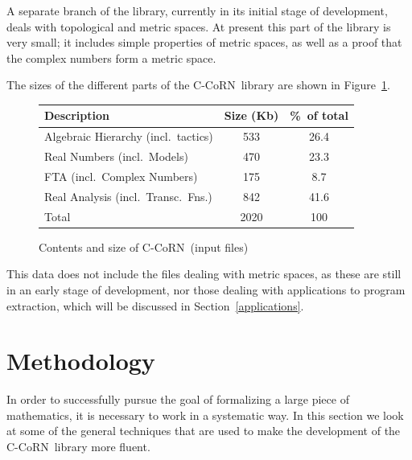 \documentclass[runningheads]{llncs}
\newcommand{\ccorn}{\mbox{C-CoRN}}
\begin{document}
A separate branch of the library, currently in its initial stage of
development, deals with topological and metric spaces.
At present this part of the library is very small; it includes simple
properties of metric spaces, as well as a proof that the complex numbers
form a metric space.

The sizes of the different parts of the \ccorn\ library are shown in
Figure~\ref{fig:contents}.
\begin{figure}
\hfill\begin{tabular}{l|c|c}
 Description                          & Size (Kb) & \%\ of total \\ \hline
 Algebraic Hierarchy (incl.\ tactics) & 533       & 26.4         \\
 Real Numbers (incl.\ Models)         & 470       & 23.3         \\
 FTA (incl.\ Complex Numbers)         & 175       &  8.7         \\
 Real Analysis (incl.\ Transc.\ Fns.) & 842       & 41.6         \\ \hline
 Total                                & 2020      & 100          \\ \hline
\end{tabular}\hspace*{\fill}
\caption{Contents and size of \ccorn\ (input files)}
\label{fig:contents}
\end{figure}
This data does not include the files dealing with metric spaces, as these are
still in an early stage of development, nor those dealing with applications to
program extraction, which will be discussed in Section~\ref{applications}.

\section{Methodology\label{methodology}}

In order to successfully pursue the goal of formalizing a large piece of
mathematics, it is necessary to work in a systematic way.
In this section we look at some of the general techniques that are used to
make the development of the \ccorn\ library more fluent.
\end{document}
